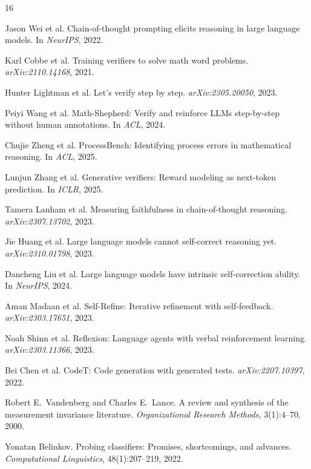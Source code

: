 \documentclass[10pt,twocolumn]{article}
\begin{document}

\begin{thebibliography}{16}

Jason Wei et al.
\newblock Chain-of-thought prompting elicits reasoning in large language models.
\newblock In \emph{NeurIPS}, 2022.

Karl Cobbe et al.
\newblock Training verifiers to solve math word problems.
\newblock \emph{arXiv:2110.14168}, 2021.

Hunter Lightman et al.
\newblock Let's verify step by step.
\newblock \emph{arXiv:2305.20050}, 2023.

Peiyi Wang et al.
\newblock Math-Shepherd: Verify and reinforce {LLM}s step-by-step without human annotations.
\newblock In \emph{ACL}, 2024.

Chujie Zheng et al.
\newblock ProcessBench: Identifying process errors in mathematical reasoning.
\newblock In \emph{ACL}, 2025.

Lunjun Zhang et al.
\newblock Generative verifiers: Reward modeling as next-token prediction.
\newblock In \emph{ICLR}, 2025.

Tamera Lanham et al.
\newblock Measuring faithfulness in chain-of-thought reasoning.
\newblock \emph{arXiv:2307.13702}, 2023.

Jie Huang et al.
\newblock Large language models cannot self-correct reasoning yet.
\newblock \emph{arXiv:2310.01798}, 2023.

Dancheng Liu et al.
\newblock Large language models have intrinsic self-correction ability.
\newblock In \emph{NeurIPS}, 2024.

Aman Madaan et al.
\newblock Self-Refine: Iterative refinement with self-feedback.
\newblock \emph{arXiv:2303.17651}, 2023.

Noah Shinn et al.
\newblock Reflexion: Language agents with verbal reinforcement learning.
\newblock \emph{arXiv:2303.11366}, 2023.

Bei Chen et al.
\newblock CodeT: Code generation with generated tests.
\newblock \emph{arXiv:2207.10397}, 2022.

Robert E.\ Vandenberg and Charles E.\ Lance.
\newblock A review and synthesis of the measurement invariance literature.
\newblock \emph{Organizational Research Methods}, 3(1):4--70, 2000.

Yonatan Belinkov.
\newblock Probing classifiers: Promises, shortcomings, and advances.
\newblock \emph{Computational Linguistics}, 48(1):207--219, 2022.

\end{thebibliography}
\end{document}
